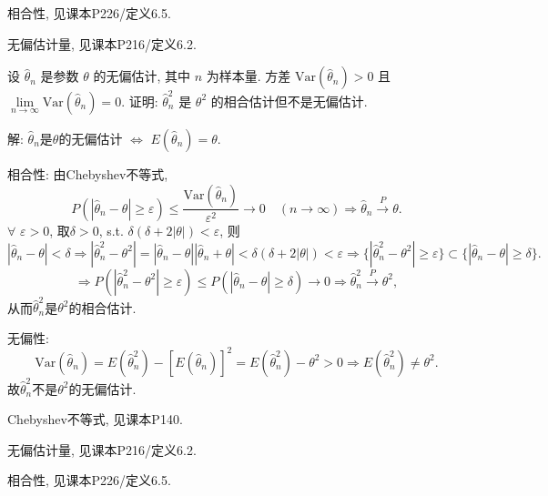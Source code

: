 \documentclass[standard]{ExBook}
\renewenvironment{shaded}{%
  \def\FrameCommand{\fboxsep=\FrameSep \colorbox{shadecolor}}%
  \MakeFramed{\advance\hsize-\width \FrameRestore}%
}{%
  \endMakeFramed
}
\begin{document}
\begin{qitems}
\textcolor{themeColor}{\selectfont {} 相合性, 见课本P226/定义6.5.}

\textcolor{themeColor}{\selectfont {} 无偏估计量, 见课本P216/定义6.2.}

\vspace{2.5cm-5em}

    \begin{bbox}
    \begin{shaded}
        \qitem
设 \(\hat{\theta}_n\) 是参数 \(\theta\) 的无偏估计, 其中 \(n\) 为样本量. 方差 \(\text{Var}(\hat{\theta}_n) > 0\) 且 \(\lim\limits_{n \to \infty} \text{Var}(\hat{\theta}_n) = 0\). 证明: \(\hat{\theta}^2_n\) 是 \(\theta^2\) 的相合估计但不是无偏估计.
    \end{shaded}
    \end{bbox}

\vspace{\dimexpr2.5cm-5em\relax}

解: $\hat{\theta}_n$是$\theta$的无偏估计 $\Longleftrightarrow$ $E(\hat{\theta}_n)=\theta$.

相合性: 由Chebyshev不等式,
$$
P(|\hat{\theta}_n-\theta|\geq\varepsilon)
\leq
\frac{\mathrm{Var}(\hat{\theta}_n)}{\varepsilon^2}
\to0\quad(n\to\infty)
\Longrightarrow
\hat{\theta}_n\xrightarrow{P}\theta.
$$
$\forall$ $\varepsilon>0$, 取$\delta>0$, s.t. $\delta(\delta+2|\theta|)<\varepsilon$, 则
$$
|\hat{\theta}_n-\theta|<\delta
\Longrightarrow
|\hat{\theta}_n^2-\theta^2|
=
|\hat{\theta}_n-\theta||\hat{\theta}_n+\theta|
<
\delta(\delta+2|\theta|)
<
\varepsilon
\Longrightarrow
\{|\hat{\theta}_n^2-\theta^2|\geq\varepsilon\}
\subset
\{|\hat{\theta}_n-\theta|\geq\delta\}.
$$
$$
\Longrightarrow
P(|\hat{\theta}_n^2-\theta^2|\geq\varepsilon)
\leq
P(|\hat{\theta}_n-\theta|\geq\delta)
\to0
\Longrightarrow
\hat{\theta}_n^2\xrightarrow{P}\theta^2,
$$
从而$\hat{\theta}_n^2$是$\theta^2$的相合估计.

无偏性:
$$
\mathrm{Var}(\hat{\theta}_n)
=
E(\hat{\theta}_n^2)-[E(\hat{\theta}_n)]^2
=
E(\hat{\theta}_n^2)-\theta^2
>0
\Longrightarrow
E(\hat{\theta}_n^2)
\neq
\theta^2.
$$
故$\hat{\theta}_n^2$不是$\theta^2$的无偏估计.

\textcolor{themeColor}{\selectfont {} Chebyshev不等式, 见课本P140.}

\textcolor{themeColor}{\selectfont {} 无偏估计量, 见课本P216/定义6.2.}

\textcolor{themeColor}{\selectfont {} 相合性, 见课本P226/定义6.5.}

\vspace{2.5cm-5em}


\end{qitems}
\end{document}

